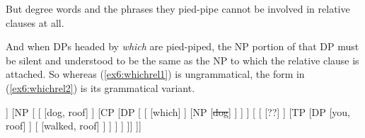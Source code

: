 But degree words and the phrases they pied-pipe cannot be involved in relative clauses at all.
\begin{exe}
\raggedright
	\ex \label{ex6:reldeg}
	\begin{xlist}
	\end{xlist}
\end{exe}
And when DPs headed by \emph{which} are pied-piped, the NP portion of that DP must be silent and understood to be the same as the NP to which the relative clause is attached. So whereas (\ref{ex6:whichrel1}) is ungrammatical, the form in (\ref{ex6:whichrel2}) is its grammatical variant.
\pagebreak
\begin{exe}
\raggedright
	\ex \label{ex6:whichrel2}
	\small
	\begin{forest}
	[DP[\ibar{D}
		[\obar{D} [the]]
		[NP [
			[ [dog, roof] ]
			[CP
				[DP [
					[ [which] ]
					[NP [\sout{dog}] ]
				] ]
				[
					[ [??] ]
					[TP
						[DP [you, roof] ]
						[ [walked, roof] ]
					 ]
				 ]
			 ]
		]]
	]]
	\end{forest}
\end{exe}

